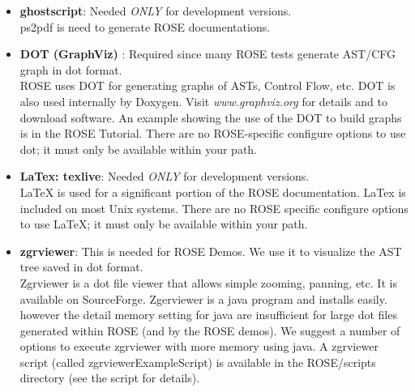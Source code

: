 \begin{itemize}
   \item {\bf ghostscript}: Needed \emph{ONLY} for development versions. \\
   ps2pdf is need  to generate ROSE documentations.

   \item {\bf DOT (GraphViz)} : Required since many ROSE tests generate
   AST/CFG graph in dot format.\\
          ROSE uses DOT for generating graphs of ASTs, Control Flow, etc.
          DOT is also used internally by Doxygen.
          Visit {\it www.graphviz.org} for details and to download software.
          An example showing the use of the DOT to build graphs is in the ROSE Tutorial.
          There are no ROSE-specific configure options to use dot; it must only be 
          available within your path.
 
   \item {\bf LaTex: texlive}: Needed \emph{ONLY} for development versions. \\
     LaTeX is used for a significant portion of the ROSE documentation. LaTex is 
     included on most Unix systems. There are no ROSE specific configure options 
     to use LaTeX; it must only be available within your path.

   \item {\bf zgrviewer}: This is needed for ROSE Demos. We use it to
   visualize the AST tree saved in dot format. \\
     Zgrviewer is a dot file viewer that allows simple zooming, panning, etc. It is
     available on SourceForge.  Zgerviewer is a java program and installs easily.
     however the detail memory setting for java are insufficient for large dot files
     generated within ROSE (and by the ROSE demos).  We suggest a number of options
     to execute zgrviewer with more memory using java.  A zgrviewer script (called
     zgrviewerExampleScript) is available in the ROSE/scripts directory (see the 
     script for details).

\end{itemize}

